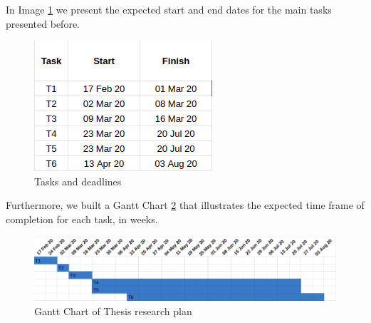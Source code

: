 In Image \ref{fig:tasks} we present the expected start and end dates for the main tasks presented before.

\begin{figure}
    \begin{center}
      \includegraphics[scale=0.75]{figures/gantt-labels.png}
      \caption{Tasks and deadlines}
      \label{fig:tasks}
    \end{center}
\end{figure}

Furthermore, we built a Gantt Chart \ref{fig:gantt} that illustrates the expected time frame of completion for each task, in weeks. 

\begin{figure}
    \begin{center}
      \includegraphics[scale=0.50]{figures/gantt-thesis.png}
      \caption[Thesis research plan]{Gantt Chart of Thesis research plan}
      \label{fig:gantt}
    \end{center}
\end{figure}